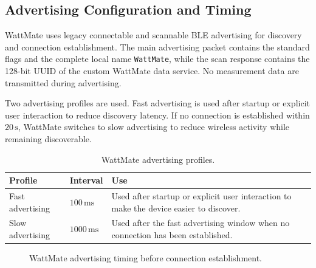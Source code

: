 \subsection{Advertising Configuration and Timing}
\label{sec:wattmate_advertising_data}

WattMate uses legacy connectable and scannable BLE advertising for discovery and connection establishment. 
The main advertising packet contains the standard flags and the complete local name \texttt{WattMate}, while the scan response contains the 128-bit UUID of the custom WattMate data service. 
No measurement data are transmitted during advertising.

Two advertising profiles are used. 
Fast advertising is used after startup or explicit user interaction to reduce discovery latency. 
If no connection is established within \(20\,\mathrm{s}\), WattMate switches to slow advertising to reduce wireless activity while remaining discoverable.

\begin{table}[H]
	\centering
	\small
	\caption{WattMate advertising profiles.}
	\label{tab:wattmate_advertising_profiles}
	\begin{tabular}{p{} p{} p{}}
		\toprule
		\textbf{Profile} & \textbf{Interval} & \textbf{Use} \\
		\midrule
		Fast advertising &
		\(100\,\mathrm{ms}\) &
		Used after startup or explicit user interaction to make the device easier to discover. \\
		
		Slow advertising &
		\(1000\,\mathrm{ms}\) &
		Used after the fast advertising window when no connection has been established. \\
		\bottomrule
	\end{tabular}
\end{table}

\begin{figure}[H]
	\centering
	\caption{WattMate advertising timing before connection establishment.}
	\label{fig:wattmate_advertising_timing}
\end{figure}

